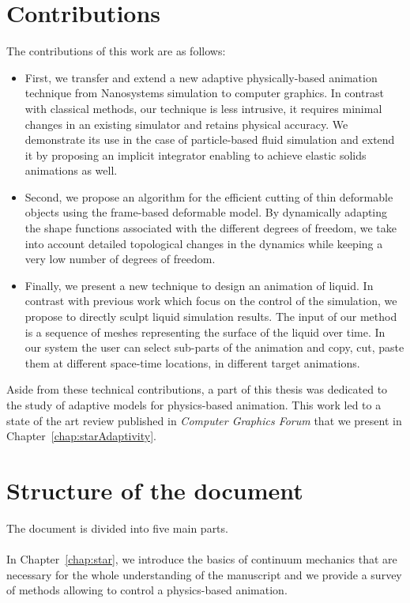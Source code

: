 \section{Contributions}
The contributions of this work are as follows:
\begin{itemize}
    \item First, we transfer and extend a new adaptive physically-based animation technique from Nanosystems simulation to computer graphics. In contrast with classical methods, our technique is less intrusive, it requires minimal changes in an existing simulator and retains physical accuracy. We demonstrate its use in the case of particle-based fluid simulation and extend it by proposing an implicit integrator enabling to achieve elastic solids animations as well.
    \item Second, we propose an algorithm for the efficient cutting of thin deformable objects using the frame-based deformable model. By dynamically adapting the shape functions associated with the different degrees of freedom, we take into account detailed topological changes in the dynamics while keeping a very low number of degrees of freedom.
    \item Finally, we present a new technique to design an animation of liquid. In contrast with previous work which focus on the control of the simulation, we propose to directly sculpt liquid simulation results. The input of our method is a sequence of meshes representing the surface of the liquid over time. In our system the user can select sub-parts of the animation and copy, cut, paste them at different space-time locations, in different target animations.
\end{itemize}
Aside from these technical contributions, a part of this thesis was dedicated to the study of adaptive models for physics-based animation. 
This work led to a state of the art review published in \emph{Computer Graphics Forum} that we present in Chapter~\ref{chap:starAdaptivity}.

\section{Structure of the document}
The document is divided into five main parts.
\paragraph*{}
In Chapter~\ref{chap:star}, we introduce the basics of continuum mechanics that are necessary for the whole understanding of the manuscript and we provide a survey of methods allowing to control a physics-based animation.
